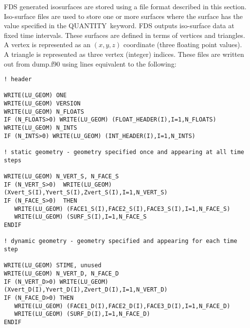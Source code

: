 \documentclass[12pt]{article}
\begin{document}
FDS generated isosurfaces are stored using a
file format described in this section.
Iso-surface files are used to store one or more surfaces where the
surface has the value specified in the {\ct QUANTITY}\ keyword.
FDS outputs iso-surface data at fixed time intervals.
These surfaces are defined in terms of vertices and triangles.
A vertex is represented as an $(x,y,z)$ coordinate (three floating point values).
A triangle is represented as three vertex (integer) indices.
These files are written out from {\ct dump.f90} using lines equivalent to the following:
\begin{lstlisting}
! header

WRITE(LU_GEOM) ONE
WRITE(LU_GEOM) VERSION
WRITE(LU_GEOM) N_FLOATS
IF (N_FLOATS>0) WRITE(LU_GEOM) (FLOAT_HEADER(I),I=1,N_FLOATS)
WRITE(LU_GEOM) N_INTS
IF (N_INTS>0) WRITE(LU_GEOM) (INT_HEADER(I),I=1,N_INTS)

! static geometry - geometry specified once and appearing at all time steps

WRITE(LU_GEOM) N_VERT_S, N_FACE_S
IF (N_VERT_S>0)  WRITE(LU_GEOM) (Xvert_S(I),Yvert_S(I),Zvert_S(I),I=1,N_VERT_S)
IF (N_FACE_S>0)  THEN
   WRITE(LU_GEOM) (FACE1_S(I),FACE2_S(I),FACE3_S(I),I=1,N_FACE_S)
   WRITE(LU_GEOM) (SURF_S(I),I=1,N_FACE_S
ENDIF

! dynamic geometry - geometry specified and appearing for each time step

WRITE(LU_GEOM) STIME, unused
WRITE(LU_GEOM) N_VERT_D, N_FACE_D
IF (N_VERT_D>0) WRITE(LU_GEOM)(Xvert_D(I),Yvert_D(I),Zvert_D(I),I=1,N_VERT_D)
IF (N_FACE_D>0) THEN
   WRITE(LU_GEOM) (FACE1_D(I),FACE2_D(I),FACE3_D(I),I=1,N_FACE_D)
   WRITE(LU_GEOM) (SURF_D(I),I=1,N_FACE_D)
ENDIF
\end{lstlisting}
\end{document}
